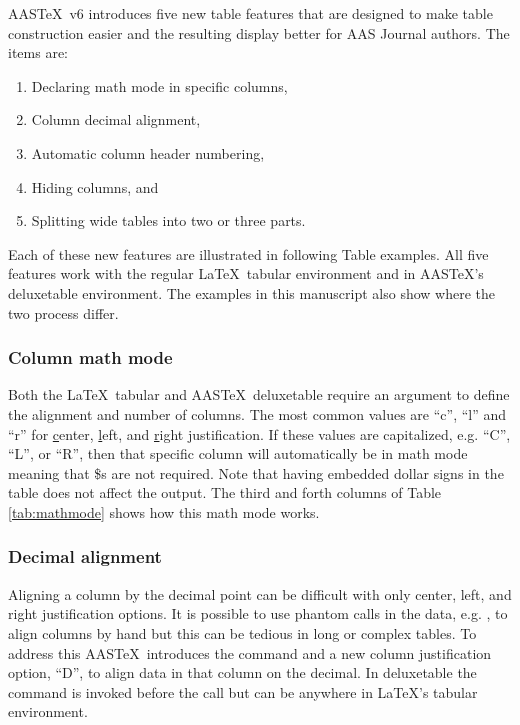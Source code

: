 \documentclass[preprint]{aastex62}
\newcommand\aastex{AAS\TeX}
\newcommand\latex{La\TeX}
\begin{document}
\aastex\ v6 introduces five new table features that are designed to make
table construction easier and the resulting display better for AAS Journal
authors.  The items are:

\begin{enumerate}
\item Declaring math mode in specific columns,
\item Column decimal alignment, 
\item Automatic column header numbering,
\item Hiding columns, and
\item Splitting wide tables into two or three parts.
\end{enumerate}

Each of these new features are illustrated in following Table examples.
All five features work with the regular \latex\ tabular environment and in
\aastex's deluxetable environment.  The examples in this manuscript also
show where the two process differ.

\subsubsection{Column math mode}

Both the \latex\ tabular and \aastex\ deluxetable require an argument to
define the alignment and number of columns.  The most common values are
``c'', ``l'' and ``r'' for \underline{c}enter, \underline{l}eft, and
\underline{r}ight justification.  If these values are capitalized, e.g.
``C'', ``L'', or ``R'', then that specific column will automatically be in math
mode meaning that \$s are not required.  Note that having embedded dollar
signs in the table does not affect the output.  The third and forth columns
of Table \ref{tab:mathmode} shows how this math mode works.

\subsubsection{Decimal alignment}

Aligning a column by the decimal point can be difficult with only center,
left, and right justification options.  It is possible to use phantom calls
in the data, e.g. {\tt\string\phn}, to align columns by hand but this can
be tedious in long or complex tables.  To address this \aastex\ introduces
the {\tt\string\decimals} command and a new column justification option,
``D'', to align data in that column on the decimal.  In deluxetable the
{\tt\string\decimals} command is invoked before the {\tt\string\startdata}
call but can be anywhere in \latex's tabular environment.  
\end{document}
